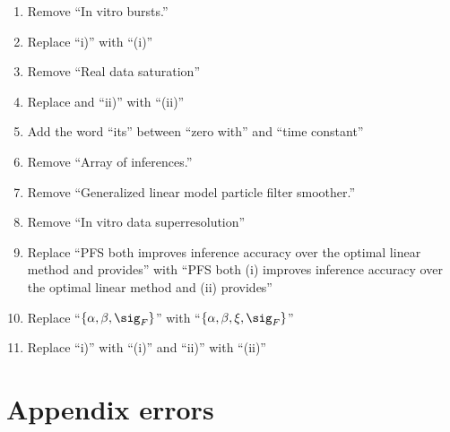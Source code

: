 \begin{enumerate}
\item Remove ``In vitro bursts.''
\item Replace ``i)'' with ``(i)'' 
\item Remove ``Real data saturation''
\item Replace and ``ii)'' with ``(ii)''
\item Add the word ``its'' between ``zero with'' and ``time constant''
\item Remove ``Array of inferences.''
\item Remove ``Generalized linear model particle filter smoother.''
\item Remove ``In vitro data superresolution''
\item Replace ``PFS both improves inference accuracy over the optimal linear method and provides'' with ``PFS both (i) improves inference accuracy over the optimal linear method and (ii) provides''
\item Replace ``$\{\alpha,\beta,\sig_F\}$'' with ``$\{\alpha, \beta, \xi, \sig_F\}$''
\item Replace ``i)'' with ``(i)'' and ``ii)'' with ``(ii)''
\end{enumerate}

\section{Appendix errors}

